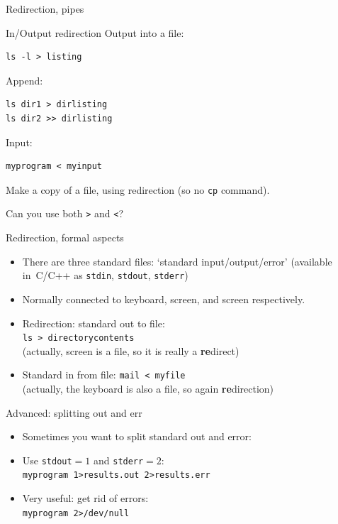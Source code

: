 \documentclass[11pt,headernav]{beamer}
\begin{document}
 {Redirection, pipes}

\begin{numberedframe}{In/Output redirection}
Output into a file:
\begin{lstlisting}
ls -l > listing
\end{lstlisting}
Append:
\begin{lstlisting}
ls dir1 > dirlisting  
ls dir2 >> dirlisting  
\end{lstlisting}
Input:
\begin{lstlisting}
myprogram < myinput
\end{lstlisting}
\end{numberedframe}

\begin{exerciseframe}{}
  Make a copy of a file, using redirection (so no \lstinline{cp} command).

  Can you use both \verb+>+ and \verb+<+?
\end{exerciseframe}

\begin{numberedframe}{Redirection, formal aspects}
  \label{sl-lnx:redirect}
  \begin{itemize}
  \item There are three standard files: `standard input/output/error'
    (available in~C/C++ as \lstinline{stdin}, \lstinline{stdout}, \lstinline{stderr})
  \item Normally connected to keyboard, screen, and screen respectively.
  \item Redirection: standard out to file:\\
    \lstinline{ls > directorycontents}\\
    (actually, screen is a file, so it is really a \textbf{re}direct)
  \item Standard in from file:
    \lstinline{mail < myfile}\\
    (actually, the keyboard is also a file, so again \textbf{re}direction)
  \end{itemize}
\end{numberedframe}

\begin{numberedframe}{Advanced: splitting out and err}
  \label{sl-lnx:stderr}
  \begin{itemize}
  \item Sometimes you want to split standard out and error:
  \item Use \lstinline{stdout}$=1$ and \lstinline{stderr}$=2$:\\
    \lstinline{myprogram 1>results.out 2>results.err}
  \item Very useful: get rid of errors:\\
    \lstinline{myprogram 2>/dev/null}
  \end{itemize}
\end{numberedframe}
\end{document}

